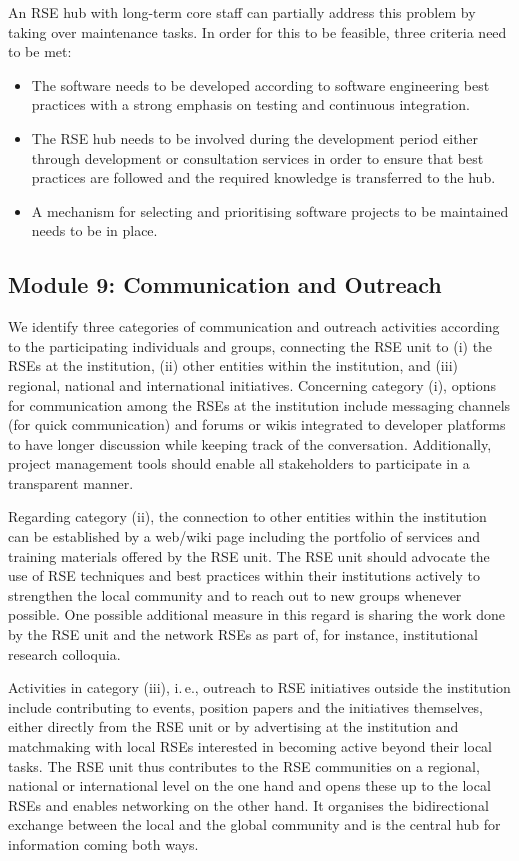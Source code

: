\documentclass[a4paper]{article}
\newcommand*{\ie}{i.\,e.,\xspace}
\begin{document}
An RSE hub with long-term core staff can partially address this problem by taking over maintenance tasks.
In order for this to be feasible, three criteria need to be met:

\begin{itemize}
\item The software needs to be developed according to software engineering best practices with a strong emphasis on testing and continuous integration.
\item The RSE hub needs to be involved during the development period either through development or consultation services in order to ensure that best practices are followed and the required knowledge is transferred to the hub.
\item A mechanism for selecting and prioritising software projects to be maintained needs to be in place.
\end{itemize}

\subsection{Module 9: Communication and Outreach}%
\label{sec:outreach}

We identify three categories of communication and outreach activities according to the participating individuals and groups, connecting the RSE unit to (i) the RSEs at the institution, (ii) other entities within the institution, and (iii) regional, national and international initiatives.
Concerning category (i), options for communication among the RSEs at the institution include messaging channels (for quick communication) and forums or wikis integrated to developer platforms to have longer discussion while keeping track of the conversation.
Additionally, project management tools should enable all stakeholders to participate in a transparent manner.

Regarding category (ii), the connection to other entities within the institution can be established by a web/wiki page including the portfolio of services and training materials offered by the RSE unit.
The RSE unit should advocate the use of RSE techniques and best practices within their institutions actively to strengthen the local community and to reach out to new groups whenever possible.
One possible additional measure in this regard is sharing the work done by the RSE unit and the network RSEs as part of, for instance, institutional research colloquia.

Activities in category (iii), \ie{} outreach to RSE initiatives outside the institution include contributing to events, position papers and the initiatives themselves, either directly from the RSE unit or by advertising at the institution and matchmaking with local RSEs interested in becoming active beyond their local tasks.
The RSE unit thus contributes to the RSE communities on a regional, national or international level on the one hand and opens these up to the local RSEs and enables networking on the other hand.
It organises the bidirectional exchange between the local and the global community and is the central hub for information coming both ways.
\end{document}

